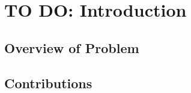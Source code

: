 \chapter{TO DO: Introduction}


% 
% 

\prechapter{%
}%

\section{Overview of Problem}

\section{Contributions}
